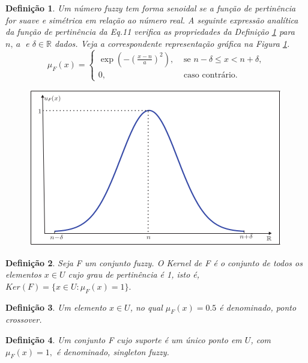 \documentclass[tcc,capa]{texufpel}
\newtheorem{Def}{Defini\c c\~ao}
\begin{document}
\begin{Def} \label{def:senoildal}
Um número fuzzy tem forma senoidal se a função de pertinência for suave e simétrica em relação ao número real. 
A seguinte expressão analítica da função de pertinência da Eq.11 verifica as propriedades da Definição \ref{def:senoildal} para $n, ~a~$ e $\delta \in \mathbb{R}$ dados. Veja a correspondente representação gráfica na Figura \ref{fig:NFuzzySino}.
\begin{equation} \label{eq:numerofuzzysenoidal}
 \mu_{F}(x)=
  \left \{
   \begin{array}{ll}
  \exp(-(\frac{x-n}{a})^{2}),  & \mbox{ se $n - \delta \leq x < n + \delta,$} \\
  0, & \mbox{ caso contrário.}
   \end{array}
  \right.
\end{equation}
\begin{figure}[ht]
\centering
\includegraphics[scale=0.485]{images/numero_fuzzy_sino.png}
\label{fig:NFuzzySino}
\end{figure}

\end{Def}


\begin{Def}
Seja F um conjunto fuzzy. O Kernel de F é o conjunto de todos os elementos $x \in U$ cujo grau de pertinência é 1, isto é, $Ker(F)= \{x \in U: \mu_{F}(x)=1\}.$
\end{Def}

\begin{Def}
Um elemento $x \in U$, no qual $\mu_{F}(x)=0.5$ é denominado, ponto crossover.
\end{Def}

\begin{Def}
Um conjunto F cujo suporte é um único ponto em $U$, com $\mu_{F}(x)=1,$ é denominado, singleton fuzzy.
\end{Def}
\end{document}
